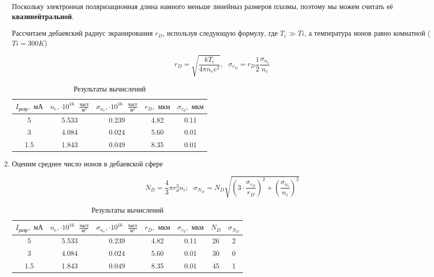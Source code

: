 \documentclass[a4paper,12pt]{article} %
\begin{document}
\begin{enumerate}
    Поскольку электронная поляризационная длина намного меньше линейныз размеров плазмы, поэтому мы можем считать её \textbf{квазинейтральной}.

    Рассчитаем дебаевский радиус экранирования $r_{D}$, используя следующую формулу, где $T_{e} \gg T{i}$, а температура ионов равно комнатной ($T{i} = 300 K$)

    \[ r_{D} = \sqrt{\frac{kT_{i}}{4\pi n_{e}e^2}}, \text{ } \sigma_{r_D} = r_{D}\frac{1}{2}\frac{\sigma_{n_e}}{n_e} \]

    \begin{table}[h]
	\centering
	\begin{tabular}{|c|c|c|c|c|}
            \hline
            $I_{\text{разр}}, \text{ мА}$ & $n_e, \cdot 10^{16} \text{ }\frac{\text{част}}{\text{м}^3}$ & $\sigma_{n_e}, \cdot 10^{16} \text{ }\frac{\text{част}}{\text{м}^3}$ & $r_D, \text{ мкм}$ & $\sigma_{r_d}, \text{ мкм}$  \\ \hline
            5 & 5.533 & 0.239 & 4.82 & 0.11 \\ \hline
            3 & 4.084 & 0.024 & 5.60 & 0.01 \\ \hline
            1.5 & 1.843 & 0.049 & 8.35 & 0.01 \\ \hline
	\end{tabular}
	\caption{Результаты вычислений}
	\label{tab9}
    \end{table}

    \item Оценим среднее число ионов в дебаевской сфере

    \[ N_{D} = \frac{4}{3}\pi r_{d}^3 n_{i}; \text{ } \sigma_{N_D} = N_{D}\sqrt{\left(3\cdot\frac{\sigma_{r_D}}{r_{D}}\right)^2 + \left(\frac{\sigma_{n_i}}{n_{i}}\right)^2} \]

    \newpage

    \begin{table}[h]
	\centering
	\begin{tabular}{|c|c|c|c|c|c|c|}
            \hline
            $I_{\text{разр}}, \text{ мА}$ & $n_e, \cdot 10^{16} \text{ }\frac{\text{част}}{\text{м}^3}$ & $\sigma_{n_e}, \cdot 10^{16} \text{ }\frac{\text{част}}{\text{м}^3}$ & $r_D, \text{ мкм}$ & $\sigma_{r_d}, \text{ мкм}$ & $N_{D}$ & $\sigma_{N_D}$  \\ \hline
            5 & 5.533 & 0.239 & 4.82 & 0.11 & 26 & 2 \\ \hline
            3 & 4.084 & 0.024 & 5.60 & 0.01 & 30 & 0 \\ \hline
            1.5 & 1.843 & 0.049 & 8.35 & 0.01 & 45 & 1 \\ \hline
	\end{tabular}
	\caption{Результаты вычислений}
	\label{tab10}
    \end{table}


\end{enumerate}
\end{document}
